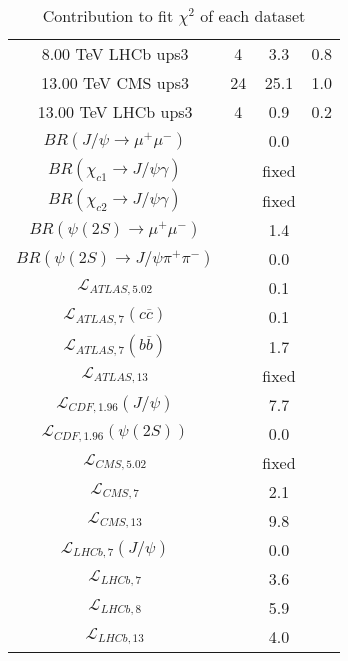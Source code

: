 \begin{table}[h!]
\begin{tabular}{c|c|c|c}
8.00 TeV LHCb ups3 & 4 & 3.3 & 0.8 \\
13.00 TeV CMS ups3 & 24 & 25.1 & 1.0 \\
13.00 TeV LHCb ups3 & 4 & 0.9 & 0.2 \\
\hline
$BR(J/\psi\rightarrow\mu^+\mu^-)$ &  & 0.0 &  \\
$BR(\chi_{c1}\rightarrow J/\psi\gamma)$ &  & fixed & \\
$BR(\chi_{c2}\rightarrow J/\psi\gamma)$ &  & fixed & \\
$BR(\psi(2S)\rightarrow\mu^+\mu^-)$ &  & 1.4 &  \\
$BR(\psi(2S)\rightarrow J/\psi\pi^+\pi^-)$ &  & 0.0 &  \\
$\mathcal L_{ATLAS,5.02}$ &  & 0.1 &  \\
$\mathcal L_{ATLAS,7}(c\overline c)$ &  & 0.1 &  \\
$\mathcal L_{ATLAS,7}(b\overline b)$ &  & 1.7 &  \\
$\mathcal L_{ATLAS,13}$ &  & fixed & \\
$\mathcal L_{CDF,1.96}(J/\psi)$ &  & 7.7 &  \\
$\mathcal L_{CDF,1.96}(\psi(2S))$ &  & 0.0 &  \\
$\mathcal L_{CMS,5.02}$ &  & fixed & \\
$\mathcal L_{CMS,7}$ &  & 2.1 &  \\
$\mathcal L_{CMS,13}$ &  & 9.8 &  \\
$\mathcal L_{LHCb,7}(J/\psi)$ &  & 0.0 &  \\
$\mathcal L_{LHCb,7}$ &  & 3.6 &  \\
$\mathcal L_{LHCb,8}$ &  & 5.9 &  \\
$\mathcal L_{LHCb,13}$ &  & 4.0 &  \\
\end{tabular}
\caption{Contribution to fit $\chi^2$ of each dataset}
\end{table}
